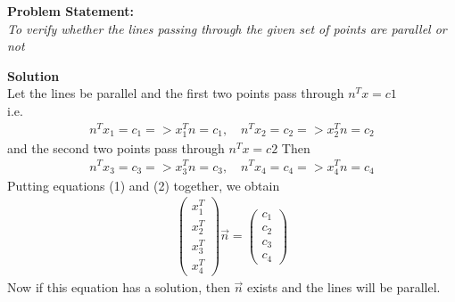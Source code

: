 \documentclass[a4paper,12pt]{article}
\newcommand{\myvec}[1]{\ensuremath{\begin{pmatrix}#1\end{pmatrix}}}
\begin{document}
\begin{flushleft}	
\textbf{Problem Statement:} \\
\textit{To verify whether the lines passing through the given set of points are parallel or not} \vspace{5mm}

\textbf{Solution} \\
Let the lines be parallel and the first two points pass through $n^Tx = c1$\\
i.e.
\begin{align}
n^Tx_1=c_1 => x_1^Tn = c_1, \quad
n^Tx_2=c_2 => x_2^Tn = c_2
\end{align}
and the second two points pass through $n^Tx = c2$
Then
\begin{align}
n^Tx_3=c_3 => x_3^Tn = c_3, \quad
n^Tx_4=c_4 => x_4^Tn = c_4
\end{align}
Putting equations (1) and (2) together, we obtain
\begin{align}
\myvec{x_1^T\\x_2^T\\x_3^T\\x_4^T}\vec{n} = \myvec{c_1\\c_2\\c_3\\c_4}
\end{align}
Now if this equation has a solution, then $\vec{n}$ exists and the lines will be parallel.
\end{flushleft}
\end{document}
